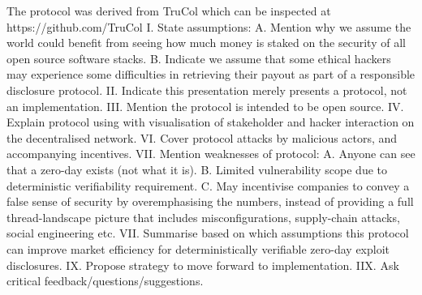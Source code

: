 \documentclass{article}
\begin{document}

The protocol was derived from TruCol which can be inspected at https://github.com/TruCol
%
I. State assumptions: 
A. Mention why we assume the world could benefit from seeing how much money is staked on the security of all open source software stacks. 
B. Indicate we assume that some ethical hackers may experience some difficulties in retrieving their payout as part of a responsible disclosure protocol.
II. Indicate this presentation merely presents a protocol, not an implementation.
III. Mention the protocol is intended to be open source.
IV. Explain protocol using with visualisation of stakeholder and hacker interaction on the decentralised network.
VI. Cover protocol attacks by malicious actors, and accompanying incentives.
VII. Mention weaknesses of protocol: 
A. Anyone can see that a zero-day exists (not what it is). 
B. Limited vulnerability scope due to deterministic verifiability requirement. 
C. May incentivise companies to convey a false sense of security by overemphasising the numbers, instead of providing a full thread-landscape picture that includes misconfigurations, supply-chain attacks, social engineering etc.
VII. Summarise based on which assumptions this protocol can improve market efficiency for deterministically verifiable zero-day exploit disclosures. 
IX. Propose strategy to move forward to implementation.
IIX. Ask critical feedback/questions/suggestions.
\end{document}
